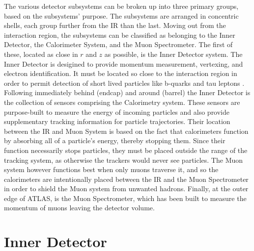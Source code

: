     The various detector subsystems can be broken up into three primary groups, based on the subsystems' purpose.
    The subsystems are arranged in concentric shells, each group further from the IR than the last.
    Moving out from the interaction region, the subsystems can be classified as belonging to the Inner Detector, the Calorimeter System, and the Muon Spectrometer.
    The first of these, located as close in $r$ and $z$ as possible, is the Inner Detector system.
    The Inner Detector is desigined to provide momentum measurement, vertexing, and electron identification.
    It must be located so close to the interaction region in order to permit detection of short lived particles like b-quarks and tau leptons \cite{id_tdr}.
    Following immediately behind (endcap) and around (barrel) the Inner Detector is the collection of sensors comprising the Calorimetry system.
    These sensors are purpose-built to measure the energy of incoming particles and also provide supplementary tracking information for particle trajectories.
    Their location between the IR and Muon System is based on the fact that calorimeters function by absorbing all of a particle's energy, thereby stopping them.
    Since their function necessarily stops particles, they must be placed outside the range of the tracking system, as otherwise the trackers would never see particles.
    The Muon system however functions best when only muons traverse it, and so the calorimeters are intentionally placed between the IR and the Muon Spectrometer in order to shield the Muon system from unwanted hadrons.
    Finally, at the outer edge of ATLAS, is the Muon Spectrometer, which has been built to measure the momentum of muons leaving the detector volume.

\section{Inner Detector} \label{sec:inner_detector}
    
